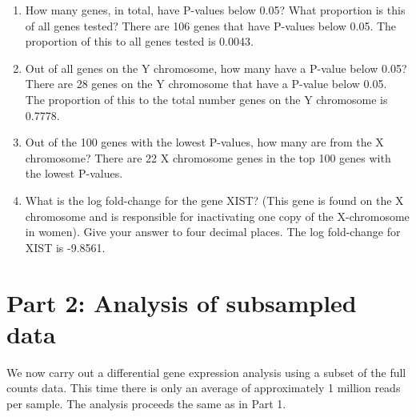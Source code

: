 \documentclass[]{article}
\begin{document}
\begin{enumerate}
\def\labelenumi{\arabic{enumi}.}
\item
  How many genes, in total, have P-values below 0.05? What proportion is
  this of all genes tested? There are 106 genes that have P-values below
  0.05. The proportion of this to all genes tested is 0.0043.
\item
  Out of all genes on the Y chromosome, how many have a P-value below
  0.05? There are 28 genes on the Y chromosome that have a P-value below
  0.05. The proportion of this to the total number genes on the Y
  chromosome is 0.7778.
\item
  Out of the 100 genes with the lowest P-values, how many are from the X
  chromosome? There are 22 X chromosome genes in the top 100 genes with
  the lowest P-values.
\item
  What is the log fold-change for the gene XIST? (This gene is found on
  the X chromosome and is responsible for inactivating one copy of the
  X-chromosome in women). Give your answer to four decimal places. The
  log fold-change for XIST is -9.8561.
\end{enumerate}

\section{Part 2: Analysis of subsampled
data}\label{part-2-analysis-of-subsampled-data}

We now carry out a differential gene expression analysis using a subset
of the full counts data. This time there is only an average of
approximately 1 million reads per sample. The analysis proceeds the same
as in Part 1.
\end{document}
